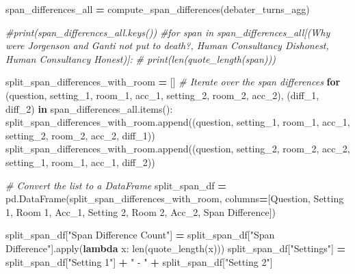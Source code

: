 \documentclass[
]{article}
\newenvironment{Shaded}{\begin{snugshade}}{\end{snugshade}}
\newcommand{\BuiltInTok}[1]{#1}
\newcommand{\CommentTok}[1]{\textcolor[rgb]{0.56,0.35,0.01}{\textit{#1}}}
\newcommand{\ControlFlowTok}[1]{\textcolor[rgb]{0.13,0.29,0.53}{\textbf{#1}}}
\newcommand{\KeywordTok}[1]{\textcolor[rgb]{0.13,0.29,0.53}{\textbf{#1}}}
\newcommand{\NormalTok}[1]{#1}
\newcommand{\OperatorTok}[1]{\textcolor[rgb]{0.81,0.36,0.00}{\textbf{#1}}}
\newcommand{\StringTok}[1]{\textcolor[rgb]{0.31,0.60,0.02}{#1}}
\begin{document}
\begin{Shaded}
\begin{Highlighting}[]
\NormalTok{span\_differences\_all }\OperatorTok{=}\NormalTok{ compute\_span\_differences(debater\_turns\_agg)}

\CommentTok{\#print(span\_differences\_all.keys())}
\CommentTok{\#for span in span\_differences\_all[(\textquotesingle{}Why were Jorgenson and Ganti not put to death?\textquotesingle{}, \textquotesingle{}Human Consultancy Dishonest\textquotesingle{}, \textquotesingle{}Human Consultancy Honest\textquotesingle{})]:}
\CommentTok{\#  print(len(quote\_length(span)))}
\end{Highlighting}
\end{Shaded}

\begin{Shaded}
\begin{Highlighting}[]
\NormalTok{split\_span\_differences\_with\_room }\OperatorTok{=}\NormalTok{ []}
\CommentTok{\# Iterate over the span differences}
\ControlFlowTok{for}\NormalTok{ (question, setting\_1, room\_1, acc\_1, setting\_2, room\_2, acc\_2), (diff\_1, diff\_2) }\KeywordTok{in}\NormalTok{ span\_differences\_all.items():}
\NormalTok{    split\_span\_differences\_with\_room.append((question, setting\_1, room\_1, acc\_1, setting\_2, room\_2, acc\_2, diff\_1))}
\NormalTok{    split\_span\_differences\_with\_room.append((question, setting\_2, room\_2, acc\_2, setting\_1, room\_1, acc\_1, diff\_2))}
    
\CommentTok{\# Convert the list to a DataFrame}
\NormalTok{split\_span\_df }\OperatorTok{=}\NormalTok{ pd.DataFrame(split\_span\_differences\_with\_room, columns}\OperatorTok{=}\NormalTok{[}\StringTok{\textquotesingle{}Question\textquotesingle{}}\NormalTok{, }\StringTok{\textquotesingle{}Setting 1\textquotesingle{}}\NormalTok{, }\StringTok{\textquotesingle{}Room 1\textquotesingle{}}\NormalTok{, }\StringTok{\textquotesingle{}Acc\_1\textquotesingle{}}\NormalTok{, }\StringTok{\textquotesingle{}Setting 2\textquotesingle{}}\NormalTok{, }\StringTok{\textquotesingle{}Room 2\textquotesingle{}}\NormalTok{, }\StringTok{\textquotesingle{}Acc\_2\textquotesingle{}}\NormalTok{, }\StringTok{\textquotesingle{}Span Difference\textquotesingle{}}\NormalTok{])}

\NormalTok{split\_span\_df[}\StringTok{"Span Difference Count"}\NormalTok{] }\OperatorTok{=}\NormalTok{ split\_span\_df[}\StringTok{"Span Difference"}\NormalTok{].}\BuiltInTok{apply}\NormalTok{(}\KeywordTok{lambda}\NormalTok{ x: }\BuiltInTok{len}\NormalTok{(quote\_length(x)))}
\NormalTok{split\_span\_df[}\StringTok{"Settings"}\NormalTok{] }\OperatorTok{=}\NormalTok{ split\_span\_df[}\StringTok{"Setting 1"}\NormalTok{] }\OperatorTok{+} \StringTok{" {-} "} \OperatorTok{+}\NormalTok{ split\_span\_df[}\StringTok{"Setting 2"}\NormalTok{]}



\end{Highlighting}
\end{Shaded}
\end{document}
